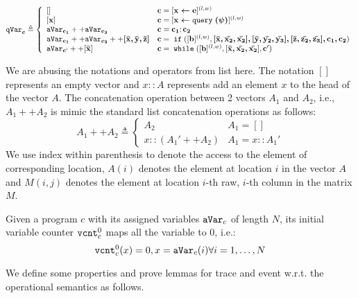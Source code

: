 {{\begin{defn}
$$
  \qvar_{\ssa{c}} \triangleq
  \left\{
  \begin{array}{ll}
      []                  
      & \ssa{c} = [\ssa{\assign x e}]^{(l, w)} 
      \\
      \left[ \ssa{x} \right]                  
      & \ssa{c} = [\ssa{\assign x \query(\qexpr)}]^{(l, w)} 
      \\
      \avar_{\ssa{c_1}} ++ \avar_{\ssa{c_2}}  
      & \ssa{c} = \ssa{c_1};\ssa{c_2}
      \\
      \avar_{\ssa{c_1}} ++ \avar_{\ssa{c_2}} ++ \ssa{[\bar{x}, \bar{y}, \bar{z}]} 
      & \ssa{c} =\eif([\sbexpr]^{(l, w)} , \ssa{[\bar{x}, \bar{x_2}, \bar{x_2}], 
      [\bar{y}, \bar{y_2}, \bar{y_3}], 
      [\bar{z}, \bar{z_2}, \bar{z_3}], c_1, c_2}) 
      \\
      \avar_{\ssa{c}'} ++ [\ssa{\bar{x}}]
      & \ssa{c}   = \ewhile ([\sbexpr]^{(l, w)}, [\ssa{\bar{x}, \bar{x_2}, \bar{x_2}}], \ssa{c}')
\end{array}
\right.
$$
\end{defn}
%
We are abusing the notations and operators from list here. 
The notation $[]$ represents an empty vector
and $x::A$ represents add an element $x$ to the head of the vector $A$.
The concatenation operation between 2 vectors $A_1$ and $A_2$, i.e., $A_1 ++ A_2$ is mimic the standard list concatenation operations as follows:
%
\begin{equation}
    A_1 ++ A_2  
    \triangleq \left\{
    \begin{array}{ll} 
      A_2         & A_1 = []\\
      x::(A_1' ++ A_2)  & A_1 = x::A_1'
    \end{array}
    \right.
\end{equation}
%
We use index within parenthesis to denote the access to the element of corresponding location,
$A(i)$ denotes the element at location $i$ in the vector $A$ and 
$M(i, j)$ denotes the element at location $i$-th raw, $i$-th column in the matrix $M$. 
%
%
%
\begin{defn}
Given a program $c$ with its assigned variables $\mathtt{aVar}_{c}$ of length $N$, its initial variable counter $\mathtt{vcnt}^0_{c}$ maps all the variable to $0$, i.e.:
\[
  \mathtt{vcnt}^0_{c}(x) = 0, x = \mathtt{aVar}_{c}(i) \forall i = 1, \ldots, N 
\]
\end{defn}
%
We define some properties and prove lemmas for trace and event w.r.t. the operational semantics as follows.
%
}}
